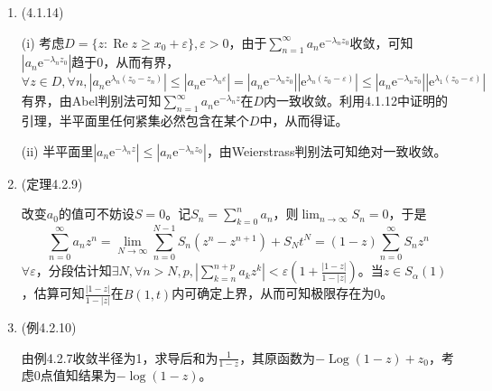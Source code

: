 \documentclass[a4paper,UTF8,fontset=windows]{ctexart}
\DeclareMathOperator{\Log}{Log}
\DeclareMathOperator{\re}{Re}
\begin{document}
\begin{enumerate}
    \item (4.1.14)
    
    (i) 考虑$D=\{z:\re z\ge x_0+\varepsilon\},\varepsilon>0$，由于$\sum_{n=1}^\infty a_n\mathrm{e}^{-\lambda_nz_0}$收敛，可知$|a_n\mathrm{e}^{-\lambda_nz_0}|$趋于0，从而有界，$\forall z\in D,\forall n,|a_n\mathrm{e}^{\lambda_n(z_0-z_n)}|\le|a_n\mathrm{e}^{-\lambda_n\varepsilon}|=|a_n\mathrm{e}^{-\lambda_nz_0}||\mathrm{e}^{\lambda_n(z_0-\varepsilon)}|\le|a_n\mathrm{e}^{-\lambda_nz_0}||\mathrm{e}^{\lambda_1(z_0-\varepsilon)}|$有界，由Abel判别法可知$\sum_{n=1}^\infty a_n\mathrm{e}^{-\lambda_nz}$在$D$内一致收敛。利用4.1.12中证明的引理，半平面里任何紧集必然包含在某个$D$中，从而得证。
    
    (ii) 半平面里$|a_n\mathrm{e}^{-\lambda_nz}|\le|a_n\mathrm{e}^{-\lambda_nz_0}|$，由Weierstrass判别法可知绝对一致收敛。
    
    \item (定理4.2.9)
    
    改变$a_0$的值可不妨设$S=0$。记$S_n=\sum_{k=0}^na_n$，则$\lim_{n\to\infty}S_n=0$，于是
    \[\sum_{n=0}^\infty a_nz^n=\lim_{N\to\infty}\sum_{n=0}^{N-1}S_n(z^n-z^{n+1})+S_Nt^N=(1-z)\sum_{n=0}^\infty S_nz^n\]
    $\forall\varepsilon$，分段估计知$\exists N,\forall n>N,p,|\sum_{k=n}^{n+p} a_kz^k|<\varepsilon(1+\frac{|1-z|}{1-|z|})$。当$z\in S_\alpha(1)$，估算可知$\frac{|1-z|}{1-|z|}$在$B(1,t)$内可确定上界，从而可知极限存在为0。
    
    \item (例4.2.10)
    
    由例4.2.7收敛半径为1，求导后和为$\frac{1}{1-z}$，其原函数为$-\Log(1-z)+z_0$，考虑0点值知结果为$-\log(1-z)$。
\end{enumerate}
\end{document}
